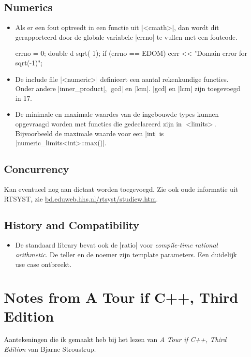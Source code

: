\begin{cpplstShortInline}
\subsection{Numerics}
\begin{itemize}
	\item 
	Als er een fout optreedt in een functie uit |<cmath>|, dan wordt dit gerapporteerd door de globale variabele |errno| te vullen met een foutcode.
\begin{cpplstfragment}
	errno = 0;
	double d {sqrt(-1)};
	if (errno == EDOM) {
		cerr << "Domain error for sqrt(-1)\n";
	}
\end{cpplstfragment}
	\item 
	De include file |<numeric>| definieert een aantal rekenkundige functies.
	Onder andere |inner_product|, |gcd| en |lcm|.
	|gcd| en |lcm| zijn toegevoegd in \Cpp{}17.
	\item 
	De minimale en maximale waardes van de ingebouwde types kunnen opgevraagd worden met functies die gedeclareerd zijn in |<limits>|.
	Bijvoorbeeld de maximale waarde voor een |int| is |numeric_limits<int>::max()|.
\end{itemize}
\subsection{Concurrency}
Kan eventueel nog aan dictaat worden toegevoegd.
Zie ook oude informatie uit RTSYST, zie \url{bd.eduweb.hhs.nl/rtsyst/studiew.htm}.
\subsection{History and Compatibility}
\begin{itemize}
	\item 
	De standaard library bevat ook de |ratio| voor \emph{compile-time rational arithmetic}.
	De teller en de noemer zijn template parameters.
	Een duidelijk use case ontbreekt.
\end{itemize}

\section{Notes from A Tour if C++, Third Edition}
Aantekeningen die ik gemaakt heb bij het lezen van \emph{A Tour if C++, Third Edition} van Bjarne Stroustrup. 


\end{cpplstShortInline}
